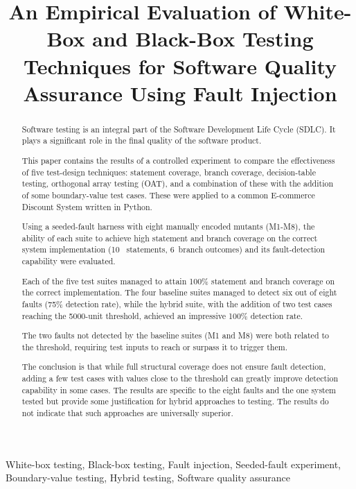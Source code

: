 \documentclass[conference]{IEEEtran}
\title{An Empirical Evaluation of White-Box and Black-Box Testing Techniques for Software Quality Assurance Using Fault Injection}
\author{
\IEEEauthorblockN{Anand Nakum}
\IEEEauthorblockA{Computer Science and Engineering\\
Institute of Technology, Nirma University\\
Ahmedabad, India\\
23bce190@nirmauni.ac.in}
\and
\IEEEauthorblockN{Yagnik Nandasana}
\IEEEauthorblockA{Computer Science and Engineering\\
Institute of Technology, Nirma University\\
Ahmedabad, India\\
23bce192@nirmauni.ac.in}
}
\begin{document}
\raggedbottom

\maketitle




\begin{abstract}

Software testing is an integral part of the Software Development Life Cycle (SDLC). It plays a significant role in the final quality of the software product.

This paper contains the results of a controlled experiment to compare the effectiveness of five test-design techniques: statement coverage, branch coverage, decision-table testing, orthogonal array testing (OAT), and a combination of these with the addition of some boundary-value test cases. These were applied to a common E-commerce Discount System written in Python.

Using a seeded-fault harness with eight manually encoded mutants (M1-M8), the ability of each suite to achieve high statement and branch coverage on the correct system implementation (10 ~statements, 6~branch outcomes) and its fault-detection capability were evaluated.

Each of the five test suites managed to attain 100\% statement and branch coverage on the correct implementation. The four baseline suites managed to detect six out of eight faults (75\% detection rate), while the hybrid suite, with the addition of two test cases reaching the 5000-unit threshold, achieved an impressive 100\% detection rate.

The two faults not detected by the baseline suites (M1 and M8) were both related to the threshold, requiring test inputs to reach or surpass it to trigger them.

The conclusion is that while full structural coverage does not ensure fault detection, adding a few test cases with values close to the threshold can greatly improve detection capability in some cases. The results are specific to the eight faults and the one system tested but provide some justification for hybrid approaches to testing. The results do not indicate that such approaches are universally superior.
\end{abstract}



\begin{IEEEkeywords}

White-box testing, Black-box testing, Fault injection, Seeded-fault experiment, Boundary-value testing, Hybrid testing, Software quality assurance

\end{IEEEkeywords}
\end{document}
